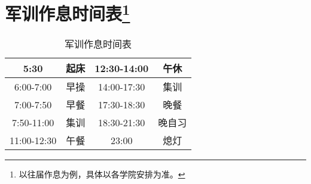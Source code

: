 \section[军训作息时间表]{军训作息时间表\footnote{以往届作息为例，具体以各学院安排为准。}}
\vspace{-1.5em}
\begin{table}[ht]
    \centering
    \begin{tabular}{|c|c|c|c|}
        \hline
        5:30        & 起床 & 12:30-14:00 & 午休  \\
        \hline
        6:00-7:00   & 早操 & 14:00-17:30 & 集训  \\
        \hline
        7:00-7:50   & 早餐 & 17:30-18:30 & 晚餐  \\
        \hline
        7:50-11:00  & 集训 & 18:30-21:30 & 晚自习 \\
        \hline
        11:00-12:30 & 午餐 & 23:00       & 熄灯  \\
        \hline
    \end{tabular}
    \vspace{-0.5em}
    \caption[exercise_time]{军训作息时间表}
\end{table}
